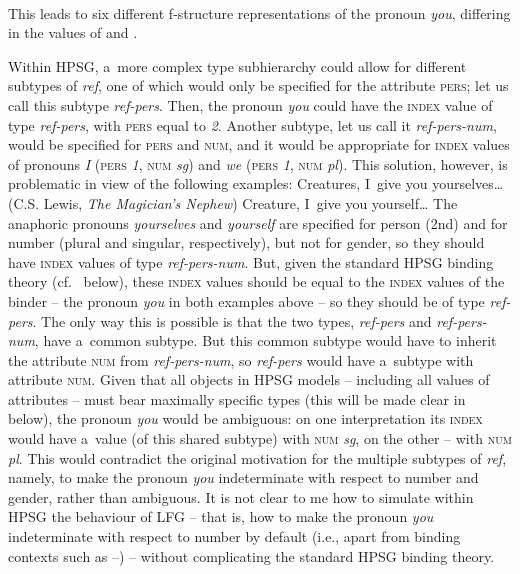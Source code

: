 \documentclass[output=paper,hidelinks]{langscibook}
\begin{document}
\ea\label{le:you:extended} 
 \\
\z
This leads to six different f-structure representations of the pronoun \emph{you}, differing in the values of \NUM and \GEND.\largerpage

Within HPSG, a~more complex type subhierarchy could allow for different subtypes of \textit{ref}, one of which would only be specified for the attribute \textsc{pers}; let us call this subtype \textit{ref-pers}.  Then, the pronoun \emph{you} could have the \textsc{index} value of type \textit{ref-pers}, with \textsc{pers} equal to \textit{2}.  Another subtype, let us call it \textit{ref-pers-num}, would be specified for \textsc{pers} and \textsc{num}, and it would be appropriate for \textsc{index} values of pronouns \emph{I} (\textsc{pers} \textit{1}, \textsc{num} \textit{sg}) and \emph{we} (\textsc{pers} \textit{1}, \textsc{num} \textit{pl}).  This solution, however, is problematic in view of the following examples:
\ea\label{ex:yourselves} Creatures, I~give you yourselves… \hfill(C.S. Lewis, \emph{The Magician's Nephew})
\ex\label{ex:yourself} Creature, I~give you yourself… 
\z
The anaphoric pronouns \emph{yourselves} and \emph{yourself} are specified for person (2nd) and for number (plural and singular, respectively), but not for gender, so they should have \textsc{index} values of type \textit{ref-pers-num}.  But, given the standard HPSG binding theory (cf.~ below), these \textsc{index} values should be equal to the \textsc{index} values of the binder -- the pronoun \emph{you} in both examples above -- so they should be of type \textit{ref-pers}.  The only way this is possible is that the two types, \textit{ref-pers} and \textit{ref-pers-num}, have a~common subtype.  But this common subtype would have to inherit the attribute \textsc{num} from \textit{ref-pers-num}, so \textit{ref-pers} would have a~subtype with attribute \textsc{num}.  Given that all objects in HPSG models -- including all values of attributes -- must bear maximally specific types (this will be made clear in  below), the pronoun \emph{you} would be ambiguous: on one interpretation its \textsc{index} would have a~value (of this shared subtype) with \textsc{num} \textit{sg}, on the other -- with \textsc{num} \textit{pl}.  This would contradict the original motivation for the multiple subtypes of \textit{ref}, namely, to make the pronoun \emph{you} indeterminate with respect to number and gender, rather than ambiguous.  It is not clear to me how to simulate within HPSG the behaviour of LFG -- that is, how to make the pronoun \emph{you} indeterminate with respect to number by default (i.e., apart from binding contexts such as --) -- without complicating the standard HPSG binding theory.
\end{document}
